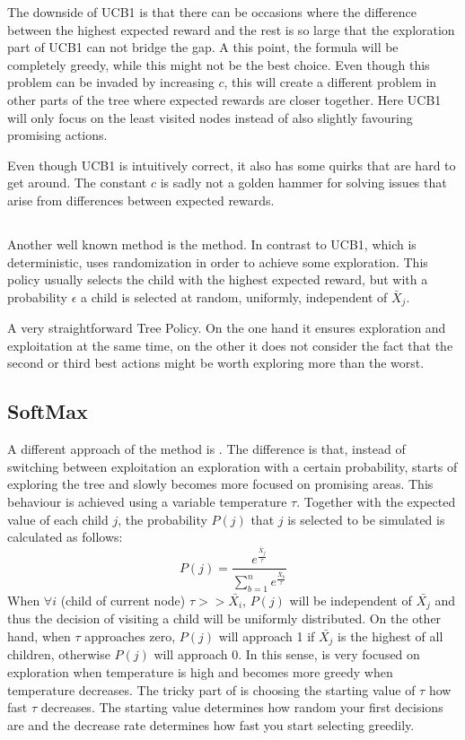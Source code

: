 The downside of UCB1 is that there can be occasions where the difference between the highest expected reward and the rest is so large that the exploration part of UCB1 can not bridge the gap. A this point, the formula will be completely greedy, while this might not be the best choice. Even though this problem can be invaded by increasing $c$, this will create a different problem in other parts of the tree where expected rewards are closer together. Here UCB1 will only focus on the least visited nodes instead of also slightly favouring promising actions.

Even though UCB1 is intuitively correct, it also has some quirks that are hard to get around. The constant $c$ is sadly not a golden hammer for solving issues that arise from differences between expected rewards. 

\subsection{\textbf{\egreedy}}

Another well known method is the \egreedy method\cite{barto1998reinforcement}. In contrast to UCB1, which is deterministic, \egreedy uses randomization in order to achieve some exploration. This policy usually selects the child with the highest expected reward, but with a probability $\epsilon$ a child is selected at random, uniformly, independent of $\bar{X}_j$.

A very straightforward Tree Policy. On the one hand it ensures exploration and exploitation at the same time, on the other it does not consider the fact that the second or third best actions might be worth exploring more than the worst. 

\subsection{SoftMax}
A different approach of the \egreedy method is \soft\cite{barto1998reinforcement}. The difference is that, instead of switching between exploitation an exploration with a certain probability, \soft starts of exploring the tree and slowly becomes more focused on promising areas. This behaviour is achieved using a variable temperature $\tau$. Together with the expected value of each child $j$, the probability $P(j)$ that $j$ is selected to be simulated is calculated as follows:  
\begin{equation}
P(j) = \frac{e^\frac{\bar{X}_j}{\tau}}{\sum_{b=1}^{n} e^\frac{\bar{X}_b}{\tau}}
\end{equation}
When $\forall i$ (child of current node) $\tau >> \bar{X_i}$, $P(j)$ will be independent of $\bar{X_j}$ and thus the decision of visiting a child will be uniformly distributed. On the other hand, when $\tau$ approaches zero, $P(j)$ will approach 1 if $\bar{X_j}$ is the highest of all children, otherwise $P(j)$ will approach 0. In this sense, \soft is very focused on exploration when temperature is high and becomes more greedy when temperature decreases. The tricky part of \soft is choosing the starting value of $\tau$ how fast $\tau$ decreases. The starting value determines how random your first decisions are and the decrease rate determines how fast you start selecting greedily. 


